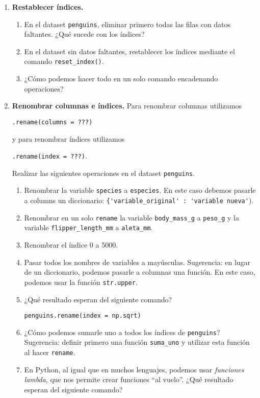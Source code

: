 \documentclass[a4paper,11pt]{article}
\theoremstyle{definition}
\begin{document}
\begin{enumerate}
\item \textbf{Restablecer índices.} 
\begin{enumerate}
\item En el dataset \lstinline{penguins}, eliminar primero todas las filas con datos faltantes. ¿Qué sucede con los índices?
\item En el dataset sin datos faltantes, restablecer los índices mediante el comando \lstinline{reset_index()}.
\item ¿Cómo podemos hacer todo en un solo comando encadenando operaciones?
\end{enumerate}

    
    
\item \textbf{Renombrar columnas e \'indices.} Para renombrar columnas utilizamos 

\lstinline{.rename(columns = ???)} 

y para renombrar índices utilizamos 

\lstinline{.rename(index = ???)}. 

Realizar las siguientes operaciones en el dataset \lstinline{penguins}.
\begin{enumerate}
\item Renombrar la variable \lstinline{species} a \lstinline {especies}. En este caso debemos pasarle a columns un diccionario: \lstinline{{'variable_original' : 'variable nueva'}).
\item Renombrar en un solo \lstinline{rename} la variable \lstinline{body_mass_g} a \lstinline{peso_g} y la variable \lstinline{flipper_length_mm} a \lstinline{aleta_mm}.
\item Renombrar el \'indice 0 a 5000.
\item Pasar todos los nombres de variables a mayúsculas. Sugerencia: en lugar de un diccionario, podemos pasarle a columnas una función. En este caso, podemos usar la función \lstinline{str.upper}.
\item ¿Qué resultado esperan del siguiente comando?

\lstinline{penguins.rename(index = np.sqrt)}

\item ¿Cómo podemos sumarle uno a todos los índices de \lstinline{penguins}? Sugerencia: definir primero una función \lstinline{suma_uno} y utilizar esta función al hacer \lstinline{rename}.
    
\item En Python, al igual que en muchos lenguajes, podemos usar \emph{funciones lambda}, que nos permite crear funciones ``al vuelo''.
¿Qué resultado esperan del siguiente comando?


\end{enumerate}
\end{enumerate}
\end{document}
